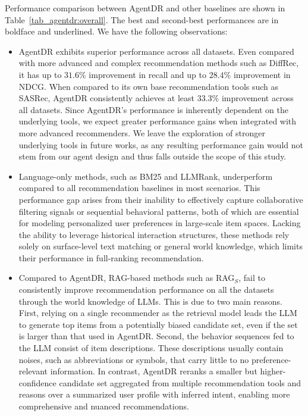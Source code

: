 Performance comparison between AgentDR and other baselines are shown in Table~\ref{tab_agentdr:overall}. The best and second-best performances are in boldface and underlined. We have the following observations:
\begin{itemize}[left=0pt]
    \item AgentDR exhibits superior performance across all datasets. Even compared with more advanced and complex recommendation methods such as DiffRec, it has up to $31.6\%$ improvement in recall and up to $28.4\%$ improvement in NDCG. When compared to its own base recommendation tools such as SASRec, AgentDR consistently achieves at least $33.3\%$ improvement across all datasets. Since AgentDR's performance is inherently dependent on the underlying tools, we expect greater performance gains when integrated with more advanced recommenders. We leave the exploration of stronger underlying tools in future works, as any resulting performance gain would not stem from our agent design and thus falls outside the scope of this study.
    \item Language-only methods, such as BM25 and LLMRank, underperform compared to all recommendation baselines in most scenarios. This performance gap arises from their inability to effectively capture collaborative filtering signals or sequential behavioral patterns, both of which are essential for modeling personalized user preferences in large-scale item spaces. Lacking the ability to leverage historical interaction structures, these methods rely solely on surface-level text matching or general world knowledge, which limits their performance in full-ranking recommendation.
    \item Compared to AgentDR, RAG-based methods such as RAG$_S$, fail to consistently improve recommendation performance on all the datasets through the world knowledge of LLMs. This is due to two main reasons. First, relying on a single recommender as the retrieval model leads the LLM to generate top items from a potentially biased candidate set, even if the set is larger than that used in AgentDR. Second, the behavior sequences fed to the LLM consist of item descriptions. These descriptions usually contain noises, such as abbreviations or symbols, that carry little to no preference-relevant information. In contrast, AgentDR reranks a smaller but higher-confidence candidate set aggregated from multiple recommendation tools and reasons over a summarized user profile with inferred intent, enabling more comprehensive and nuanced recommendations.
\end{itemize}



